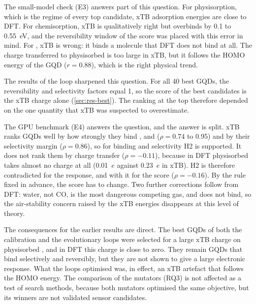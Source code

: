 The small-model check (E3) answers part of this question. For physisorption, which is the regime
of every top candidate, xTB adsorption energies are close to DFT. For chemisorption, xTB is
qualitatively right but overbinds by 0.1 to 0.55~eV, and the reversibility window of the score was
placed with this error in mind. For , xTB is wrong: it binds a molecule that DFT does not
bind at all. The charge transferred to physisorbed  is too large in xTB, but it follows the
HOMO energy of the GQD (\(r = 0.88\)), which is the right physical trend.

The results of the loop sharpened this question. For all 40 best GQDs, the reversibility and
selectivity factors equal 1, so the score of the best candidates is the xTB charge alone
(\cref{sec:res-best}). The ranking at the top therefore depended on the one quantity that xTB was
suspected to overestimate.

The GPU benchmark (E4) answers the question, and the answer is split. xTB ranks GQDs well by how
strongly they bind ,  and  (\(\rho = 0.74\) to 0.95) and by their
selectivity margin (\(\rho = 0.86\)), so for binding and selectivity H2 is supported. It does not
rank them by charge transfer (\(\rho = -0.11\)), because in DFT physisorbed  takes almost
no charge at all (0.01~\(e\) against 0.23~\(e\) in xTB). H2 is therefore contradicted for the
response, and with it for the score (\(\rho = -0.16\)). By the rule fixed in advance, the score has
to change. Two further corrections follow from DFT: water, not CO, is the most dangerous
competing gas, and  does not bind, so the air-stability concern raised by the xTB 
energies disappears at this level of theory.

The consequences for the earlier results are direct. The best GQDs of both the calibration and
the evolutionary loops were selected for a large xTB charge on physisorbed , and in DFT
this charge is close to zero. They remain GQDs that bind  selectively and reversibly, but
they are not shown to give a large electronic response. What the loops optimised was, in effect,
an xTB artefact that follows the HOMO energy. The comparison of the mutators (RQ3) is not affected
as a test of search methods, because both mutators optimised the same objective, but its winners
are not validated sensor candidates.

